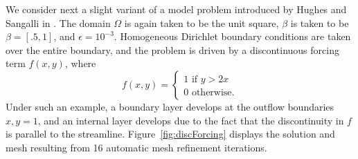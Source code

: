 We consider next a slight variant of a model problem introduced by Hughes and Sangalli in \cite{HughesVMS}.  The domain $\Omega$ is again taken to be the unit square, $\beta$ is taken to be $\beta = [.5,1]$, and $\epsilon = 10^{-3}$.  Homogeneous Dirichlet boundary conditions are taken over the entire boundary, and the problem is driven by a discontinuous forcing term $f(x,y)$, where
\[
f(x,y) = \begin{cases}
1 \text{ if } y > 2x \\
0 \text{ otherwise}.
\end{cases}
\]
Under such an example, a boundary layer develops at the outflow boundaries $x,y = 1$, and an internal layer develops due to the fact that the discontinuity in $f$ is parallel to the streamline.  Figure~\ref{fig:discForcing} displays the solution and mesh resulting from 16 automatic mesh refinement iterations.  
